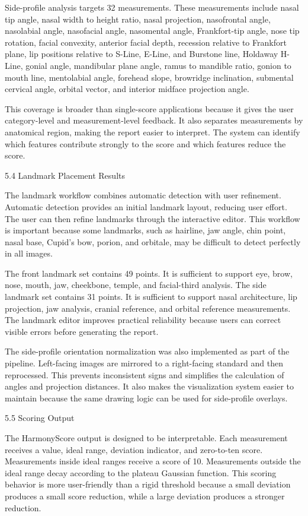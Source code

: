 Side-profile analysis targets 32 measurements. These measurements include nasal tip angle, nasal width to height ratio, nasal projection, nasofrontal angle, nasolabial angle, nasofacial angle, nasomental angle, Frankfort-tip angle, nose tip rotation, facial convexity, anterior facial depth, recession relative to Frankfort plane, lip positions relative to S-Line, E-Line, and Burstone line, Holdaway H-Line, gonial angle, mandibular plane angle, ramus to mandible ratio, gonion to mouth line, mentolabial angle, forehead slope, browridge inclination, submental cervical angle, orbital vector, and interior midface projection angle.

This coverage is broader than single-score applications because it gives the user category-level and measurement-level feedback. It also separates measurements by anatomical region, making the report easier to interpret. The system can identify which features contribute strongly to the score and which features reduce the score.

5.4  Landmark Placement Results

The landmark workflow combines automatic detection with user refinement. Automatic detection provides an initial landmark layout, reducing user effort. The user can then refine landmarks through the interactive editor. This workflow is important because some landmarks, such as hairline, jaw angle, chin point, nasal base, Cupid's bow, porion, and orbitale, may be difficult to detect perfectly in all images.

The front landmark set contains 49 points. It is sufficient to support eye, brow, nose, mouth, jaw, cheekbone, temple, and facial-third analysis. The side landmark set contains 31 points. It is sufficient to support nasal architecture, lip projection, jaw analysis, cranial reference, and orbital reference measurements. The landmark editor improves practical reliability because users can correct visible errors before generating the report.

The side-profile orientation normalization was also implemented as part of the pipeline. Left-facing images are mirrored to a right-facing standard and then reprocessed. This prevents inconsistent signs and simplifies the calculation of angles and projection distances. It also makes the visualization system easier to maintain because the same drawing logic can be used for side-profile overlays.

5.5  Scoring Output

The HarmonyScore output is designed to be interpretable. Each measurement receives a value, ideal range, deviation indicator, and zero-to-ten score. Measurements inside ideal ranges receive a score of 10. Measurements outside the ideal range decay according to the plateau Gaussian function. This scoring behavior is more user-friendly than a rigid threshold because a small deviation produces a small score reduction, while a large deviation produces a stronger reduction.

